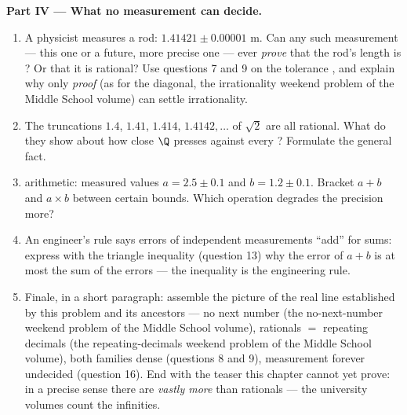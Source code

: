 \begin{problem}
\medskip
\noindent\textbf{Part IV --- What no measurement can decide.}
\begin{enumerate}[resume]
  \item A physicist measures a rod: $1.41421 \pm 0.00001$ m.
        Can any such measurement --- this one or a future, more
        precise one --- ever \emph{prove} that the rod's length
        is ? Or that it is rational? Use questions 7
        and 9 on the tolerance , and explain why only
        \emph{proof} (as for the diagonal, the irrationality weekend problem of the Middle School volume)
        can settle irrationality.
  \item The truncations $1.4$, $1.41$, $1.414$, $1.4142,\dots$
        of $\sqrt2$ are all rational. What do they show about
        how close $\Q$ presses against every ?
        Formulate the general fact.
  \item {} arithmetic: measured values $a = 2.5 \pm 0.1$
        and $b = 1.2 \pm 0.1$. Bracket $a + b$ and $a \times b$
        between certain bounds. Which operation degrades the
        precision more?
  \item An engineer's rule says errors of independent
        measurements ``add'' for sums: express with the triangle
        inequality (question 13) why the error of $a + b$ is at
        most the sum of the errors --- the inequality is the
        engineering rule.
  \item Finale, in a short paragraph: assemble the picture of
        the real line established by this problem and its
        ancestors --- no next number
        (the no-next-number weekend problem of the Middle School volume), rationals $=$ repeating
        decimals (the repeating-decimals weekend problem of the Middle School volume), both families dense
        (questions 8 and 9), measurement forever undecided
        (question 16). End with the teaser this chapter cannot
        yet prove: in a precise sense there are \emph{vastly
        more}  than rationals --- the university
        volumes count the infinities.
\end{enumerate}
\end{problem}

